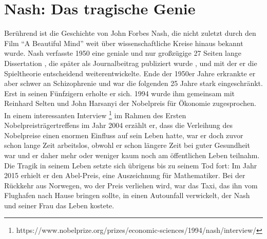 \section{Nash: Das tragische Genie}
Berührend ist die Geschichte von John Forbes Nash, die nicht zuletzt durch den Film "`A Beautiful Mind"' weit über wissenschaftliche Kreise hinaus bekannt wurde. Nash verfasste 1950 eine geniale und nur großzügige\parencite[S. 164]{Nash1994} 27 Seiten lange Dissertation \parencite{Nash1950}, die später als Journalbeitrag publiziert wurde \parencite{Nash1951}, und mit der er die Spieltheorie entscheidend weiterentwickelte. Ende der 1950er Jahre erkrankte er aber schwer an Schizophrenie und war die folgenden 25 Jahre stark eingeschränkt. Erst in seinen Fünfzigern erholte er sich. 1994 wurde ihm gemeinsam mit Reinhard Selten und John Harsanyi der Nobelpreis für Ökonomie zugesprochen. In einem interessanten Interview \parencite{Nash2004}\footnote{https://www.nobelprize.org/prizes/economic-sciences/1994/nash/interview/} im Rahmen des Ersten Nobelpreisträgertreffens im Jahr 2004 erzählt er, dass die Verleihung des Nobelpreise einen enormen Einfluss auf sein Leben hatte, war er doch zuvor schon lange Zeit arbeitslos, obwohl er schon längere Zeit bei guter Gesundheit war und er daher mehr oder weniger kaum noch am öffentlichen Leben teilnahm. Die Tragik in seinem Leben setzte sich übrigens bis zu seinem Tod fort: Im Jahr 2015 erhielt er den Abel-Preis, eine Auszeichnung für Mathematiker. Bei der Rückkehr aus Norwegen, wo der Preis verliehen wird, war das Taxi, das ihn vom Flughafen nach Hause bringen sollte, in einen Autounfall verwickelt, der Nash und seiner Frau das Leben kostete. 

